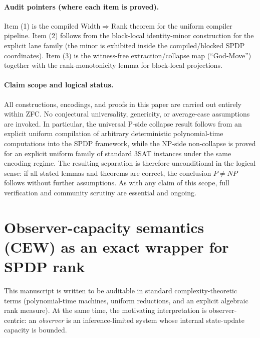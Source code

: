 \documentclass[12pt]{article}
\theoremstyle{definition}
\theoremstyle{definition}
\theoremstyle{remark}
\theoremstyle{remark}
\begin{document}
\paragraph{Audit pointers (where each item is proved).}
Item (1) is the compiled Width$\Rightarrow$Rank theorem for the uniform compiler pipeline.
Item (2) follows from the block-local identity-minor construction for the explicit lane
family (the minor is exhibited inside the compiled/blocked SPDP coordinates).
Item (3) is the witness-free extraction/collapse map (``God-Move'') together with the
rank-monotonicity lemma for block-local projections.

\paragraph{Claim scope and logical status.}
All constructions, encodings, and proofs in this paper are carried out
entirely within ZFC. No conjectural universality, genericity, or
average-case assumptions are invoked. In particular, the universal
P-side collapse result follows from an explicit uniform compilation of
arbitrary deterministic polynomial-time computations into the SPDP
framework, while the NP-side non-collapse is proved for an explicit
uniform family of standard $3$SAT instances under the same encoding
regime. The resulting separation is therefore unconditional in the
logical sense: if all stated lemmas and theorems are correct, the
conclusion $P\neq NP$ follows without further assumptions. As with any
claim of this scope, full verification and community scrutiny are
essential and ongoing.


\section{Observer-capacity semantics (CEW) as an exact wrapper for SPDP rank}
\label{sec:cew-wrapper}

This manuscript is written to be auditable in standard complexity-theoretic
terms (polynomial-time machines, uniform reductions, and an explicit algebraic
rank measure).  At the same time, the motivating interpretation is observer-centric:
an \emph{observer} is an inference-limited system whose internal state-update
capacity is bounded.
\end{document}
